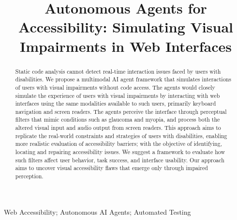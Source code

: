 \documentclass[10pt, conference]{IEEEtran}
\begin{document}
\title{Autonomous Agents for Accessibility: Simulating Visual Impairments in Web Interfaces}

\author{
\and
{}
}

\maketitle

\begin{abstract}
Static code analysis cannot detect real-time interaction issues faced by users with disabilities. We propose a multimodal AI agent framework that simulates interactions of users with visual impairments without code access. 
The agents would closely simulate the experience of users with visual impairments by interacting with web interfaces using the same modalities available to such users, primarily keyboard navigation and screen readers. The agents perceive the interface through perceptual filters that mimic conditions such as glaucoma and myopia, and process both the altered visual input and audio output from screen readers. This approach aims to replicate the real-world constraints and strategies of users with disabilities, enabling more realistic evaluation of accessibility barriers; with the objective of identifying, locating and repairing accessibility issues.
We suggest a framework to evaluate how such filters affect user behavior, task success, and interface usability. Our approach aims to uncover visual accessibility flaws that emerge only through impaired perception. 
\end{abstract}

\begin{IEEEkeywords}
Web Accessibility; Autonomous \ac{AI} Agents; Automated Testing
\end{IEEEkeywords}









\balance


\end{document}
